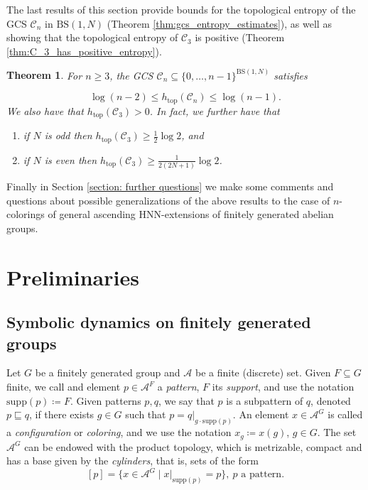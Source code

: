 \documentclass[cupthm,crop,info]{CUP-JNL-ETS}%
\theoremstyle{cupplain}
\newtheorem{theorem}{Theorem}[section]
\theoremstyle{cupdefinition}
\theoremstyle{cupremark}
\theoremstyle{cupproof}
\numberwithin{equation}{section}
\newcommand{\BS}[1][N]{\mathrm{BS}(1,#1)}
\def\htop{h_{\mathrm{top}}}
\begin{document}
The last results of this section provide bounds for the topological entropy of the GCS $\mathcal{C}_n$ in $\BS$ (Theorem \ref{thm:gcs_entropy_estimates}), as well as showing that the topological entropy of $\mathcal{C}_3$ is positive (Theorem \ref{thm:C_3_has_positive_entropy}).
\begin{theorem} \label{thm:summary_gcs_entropy}
	For $n\ge 3$, the GCS $\mathcal{C}_n\subseteq\{0,\ldots,n-1\}^{\BS}$ satisfies
	
	$$
	\log(n-2)\le\htop(\mathcal{C}_n)\le\log(n-1).
	$$
	We also have that $\htop(\mathcal{C}_3)>0$. In fact, we further have that
	\begin{enumerate}
		\item if $N$ is odd then $\htop(\mathcal{C}_3)\ge\frac{1}{2}\log 2$, and
		\item if $N$ is even then $\htop(\mathcal{C}_3)\ge\frac{1}{2(2N+1)}\log 2$.
	\end{enumerate}
\end{theorem}

Finally in Section \ref{section: further questions} we make some comments and questions about possible generalizations of the above results to the case of $n$-colorings of general ascending HNN-extensions of finitely generated abelian groups.




\section{Preliminaries}\label{section:preliminaries}

\subsection{Symbolic dynamics on finitely generated groups}
Let $G$ be a finitely generated group and $\mathcal{A}$ be a finite (discrete) set. Given $F\subseteq G$ finite, we call and element $p\in \mathcal{A}^{F}$ a \textit{pattern}, $F$ its \textit{support}, and use the notation $\mathrm{supp}(p)\coloneqq F$. Given patterns $p,q$, we say that $p$ is a subpattern of $q$, denoted $p\sqsubseteq q$, if there exists $g\in G$ such that $p=q|_{g\cdot \mathrm{supp}(p)}$. An element $x\in \mathcal{A}^G$ is called a \textit{configuration} or \textit{coloring}, and we use the notation $x_g\coloneqq x(g)$, $g\in G$. The set $\mathcal{A}^G$ can be endowed with the product topology, which is metrizable, compact and has a base given by the \textit{cylinders}, that is, sets of the form
$$
[p]=\{x\in \mathcal{A}^G\mid x|_{\mathrm{supp}(p)}=p \}, \ p\text{ a pattern}.
$$ 
\end{document}
